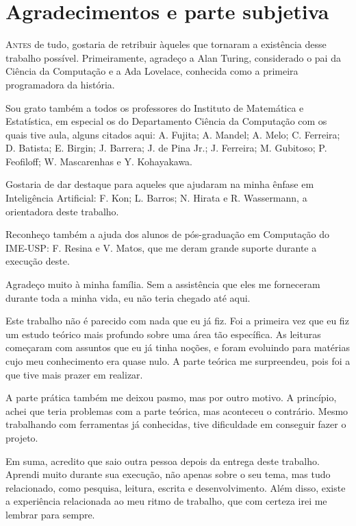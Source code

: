 \chapter*{Agradecimentos e parte subjetiva}

\lettrine{A}{ntes} de tudo, gostaria de retribuir àqueles que tornaram a existência desse trabalho possível. Primeiramente, agradeço a Alan Turing, considerado o pai da Ciência da Computação e a Ada Lovelace, conhecida como a primeira programadora da história.

Sou grato também a todos os professores do Instituto de Matemática e Estatística, em especial os do Departamento Ciência da Computação com os quais tive aula, alguns citados aqui: A. Fujita; A. Mandel; A. Melo; C. Ferreira; D. Batista; E. Birgin; J. Barrera; J. de Pina Jr.; J. Ferreira; M. Gubitoso; P. Feofiloff; W. Mascarenhas e Y. Kohayakawa. 

Gostaria de dar destaque para aqueles que ajudaram na minha ênfase em Inteligência Artificial: F. Kon; L. Barros; N. Hirata e R. Wassermann, a orientadora deste trabalho.

Reconheço também a ajuda dos alunos de pós-graduação em Computação do IME-USP: F. Resina e V. Matos, que me deram grande suporte durante a execução deste. 

Agradeço muito à minha família. Sem a assistência que eles me forneceram durante toda a minha vida, eu não teria chegado até aqui.

Este trabalho não é parecido com nada que eu já fiz. Foi a primeira vez que eu fiz um estudo teórico mais profundo sobre uma área tão específica. As leituras começaram com assuntos que eu já tinha noções, e foram evoluindo para matérias cujo meu conhecimento era quase nulo. A parte teórica me surpreendeu, pois foi a que tive mais prazer em realizar.

A parte prática também me deixou pasmo, mas por outro motivo. A princípio, achei que teria problemas com a parte teórica, mas aconteceu o contrário. Mesmo trabalhando com ferramentas já conhecidas, tive dificuldade em conseguir fazer o projeto.

Em suma, acredito que saio outra pessoa depois da entrega deste trabalho. Aprendi muito durante sua execução, não apenas sobre o seu tema, mas tudo relacionado, como pesquisa, leitura, escrita e desenvolvimento. Além disso, existe a experiência relacionada ao meu ritmo de trabalho, que com certeza irei me lembrar para sempre.